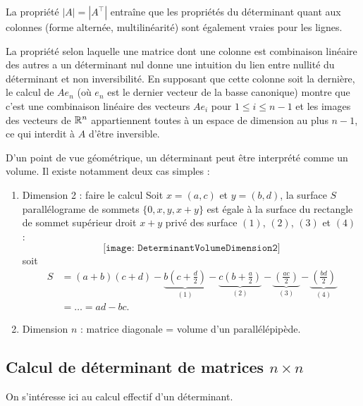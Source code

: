\remark La propriété $|A| = |A^\top|$ entraîne que les propriétés du déterminant quant aux colonnes (forme alternée, multilinéarité) sont également vraies pour les lignes. 

\remark La propriété selon laquelle une matrice dont une colonne est combinaison linéaire des autres a un déterminant nul donne une intuition du lien entre nullité du déterminant et non inversibilité. En supposant que cette colonne soit la dernière, le calcul de $A e_n$ (où $e_n$ est le dernier vecteur de la basse canonique) montre que c'est une combinaison linéaire des vecteurs $A e_i$ pour $1 \leq i \leq n-1$ et les images des vecteurs de $\mathbb{R}^n$ appartiennent toutes à un espace de dimension au plus $n-1$, ce qui interdit à $A$ d'être inversible.

\remark D'un point de vue géométrique, un déterminant peut être interprété comme un volume. Il existe notamment deux cas simples :
\begin{enumerate}
 \item Dimension 2 : faire le calcul
  Soit $x = (a, c)$ et $y = (b, d)$, la surface $S$ parallélograme de sommets $\{0, x, y, x+y\}$ est égale à la surface du rectangle de sommet supérieur droit $x+y$ privé des surface $(1)$, $(2)$, $(3)$ et $(4)$ : 
  $$
  \texttt{[image: DeterminantVolumeDimension2]}
  $$
  soit
  \begin{align*}
    S 
    & = (a+b)(c+d) 
    - \underset{(1)}{\underbrace{b\left(c + \frac{d}2\right)}} 
    - \underset{(2)}{\underbrace{c\left(b + \frac{a}2\right)}} 
    - \underset{(3)}{\underbrace{\left(\frac{ac}2\right)}} 
    - \underset{(4)}{\underbrace{\left(\frac{bd}2\right)}} \\
    & = \dots = ad - bc.
  \end{align*}
 \item Dimension $n$ : matrice diagonale = volume d'un parallélépipède.
\end{enumerate}

\subsection{Calcul de déterminant de matrices $n \times n$} 

On s'intéresse ici au calcul effectif d'un déterminant.

